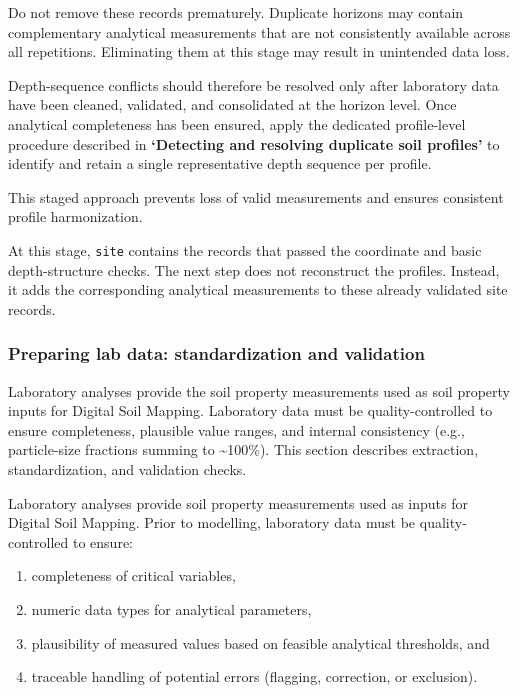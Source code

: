 \documentclass[
  10pt,
  b5paper,
  oneside]{book}
\providecommand{\tightlist}{%
  \setlength{\itemsep}{0pt}\setlength{\parskip}{0pt}}
\begin{document}
Do not remove these records prematurely. Duplicate horizons may contain complementary analytical measurements that are not consistently available across all repetitions. Eliminating them at this stage may result in unintended data loss.

Depth-sequence conflicts should therefore be resolved only after laboratory data have been cleaned, validated, and consolidated at the horizon level. Once analytical completeness has been ensured, apply the dedicated profile-level procedure described in \textbf{`Detecting and resolving duplicate soil profiles'} to identify and retain a single representative depth sequence per profile.

This staged approach prevents loss of valid measurements and ensures consistent profile harmonization.

At this stage, \texttt{site} contains the records that passed the coordinate and basic depth-structure checks. The next step does not reconstruct the profiles. Instead, it adds the corresponding analytical measurements to these already validated site records.

\subsubsection{Preparing lab data: standardization and validation}\label{preparing-lab-data-standardization-and-validation}

Laboratory analyses provide the soil property measurements used as soil property inputs for Digital Soil Mapping. Laboratory data must be quality-controlled to ensure completeness, plausible value ranges, and internal consistency (e.g., particle-size fractions summing to \textasciitilde100\%). This section describes extraction, standardization, and validation checks.

Laboratory analyses provide soil property measurements used as inputs for Digital Soil Mapping. Prior to modelling, laboratory data must be quality-controlled to ensure:

\begin{enumerate}
\def\labelenumi{(\roman{enumi})}
\tightlist
\item
  completeness of critical variables,
\item
  numeric data types for analytical parameters,
\item
  plausibility of measured values based on feasible analytical thresholds, and
\item
  traceable handling of potential errors (flagging, correction, or exclusion).
\end{enumerate}
\end{document}
